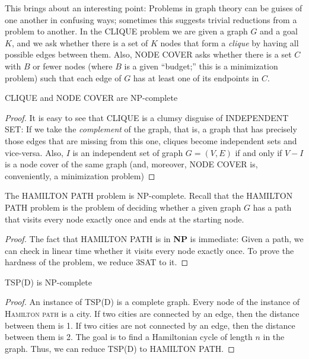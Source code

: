 \documentclass[12pt]{article}
\begin{document}
This brings about an interesting point: Problems in graph theory can be guises of one another in confusing ways; sometimes this suggests trivial reductions from a problem to another. In the \textsc{CLIQUE} problem we are given a graph $G$ and a goal $K$, and we ask whether there is a set of $K$ nodes that form a \textit{clique} by having all possible edges between them. Also, \textsc{NODE COVER} asks whether there is a set $C$ with $B$ or fewer nodes (where $B$ is a given ``budget;'' this is a minimization problem) such that each edge of $G$ has at least one of its endpoints in $C$.
\begin{defbox}[Corollary]
  CLIQUE and NODE COVER are NP-complete
\end{defbox}
\begin{proof}
  It is easy to see that \textsc{CLIQUE} is a clumsy disguise of \textsc{INDEPENDENT SET}: If we take the \textit{complement} of the graph, that is, a graph that has precisely those edges that are missing from this one, cliques become independent sets and vice-versa. Also, $I$ is an independent set of graph $G = (V, E)$ if and only if $V - I$ is a node cover of the same graph (and, moreover, \textsc{NODE COVER} is, conveniently, a minimization problem)
\end{proof}
\begin{defbox}[Theorem]
  The \textsc{HAMILTON PATH} problem is NP-complete.
  Recall that the \textsc{HAMILTON PATH} problem is the problem of deciding whether a given graph $G$ has a path that visits every node exactly once and ends at the starting node.   
\end{defbox}
\begin{proof}
  The fact that \textsc{HAMILTON PATH} is in \textbf{NP} is immediate: Given a path, we can check in linear time whether it visits every node exactly once. To prove the hardness of the problem, we reduce \textsc{3SAT} to it.
\end{proof}
\begin{defbox}[Theorem]
  \textsc{TSP(D)} is NP-complete
\end{defbox}
\begin{proof}
  An instance of \textsc{TSP(D)} is a complete graph. Every node of the instance of \textsc{Hamilton path} is a city. If two cities are connected by an edge, then the distance between them is 1. If two cities are not connected by an edge, then the distance between them is 2. The goal is to find a Hamiltonian cycle of length $n$ in the graph. Thus, we can reduce \textsc{TSP(D)} to \textsc{HAMILTON PATH}.
\end{proof}
\end{document}
